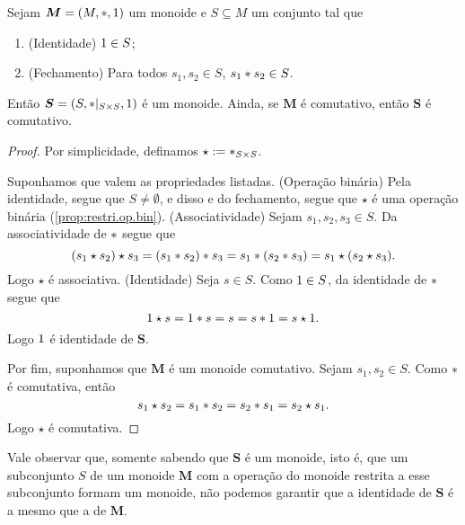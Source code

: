 \begin{proposition}
\label{alge:prop.submon}
Sejam $\bm M=(M,\ast,1)$ um monoide e $S \subseteq M$ um conjunto tal que
	\begin{enumerate}[label=\textbf{SM\arabic*.},ref={SM\arabic*}]
	\item \label{SM1} (Identidade) $1 \in S$;
	\item \label{SM2} (Fechamento) Para todos $s_1,s_2 \in S$, $s_1 \ast s_2 \in S$.
	\end{enumerate}
\noindent
Então $\bm S=(S,\ast|_{S \times S},1)$ é um monoide. Ainda, se $\bm M$ é comutativo, então $\bm S$ é comutativo.
\end{proposition}
\begin{proof} Por simplicidade, definamos $\star :=  \ast _{S \times S}$.


Suponhamos que valem as propriedades listadas. (Operação binária) Pela identidade, segue que $S \neq \emptyset$, e disso e do fechamento, segue que $\star$ é uma operação binária (\ref{prop:restri.op.bin}).
(Associatividade) Sejam $s_1,s_2,s_3 \in S$. Da associatividade de $ \ast $ segue que
	\begin{equation*}
	 (s_1 \star s_2) \star s_3 = (s_1  \ast  s_2)  \ast  s_3 = s_1  \ast  (s_2  \ast  s_3) = s_1 \star (s_2 \star s_3).
	 \end{equation*}
Logo $\star$ é associativa. (Identidade) Seja $s \in S$. Como $1 \in S$, da identidade de $ \ast $ segue que
	\begin{equation*}
	1 \star s = 1  \ast  s = s = s \ast  1 = s \star 1.
	\end{equation*}
Logo $1$ é identidade de $\bm S$.

Por fim, suponhamos que $\bm M$ é um monoide comutativo. Sejam $s_1,s_2 \in S$. Como $ \ast $ é comutativa, então
	\begin{equation*}
	s_1 \star s_2 = s_1  \ast  s_2 = s_2  \ast  s_1 = s_2 \star s_1.
	\end{equation*}
Logo $\star$ é comutativa.
\end{proof}

Vale observar que, somente sabendo que $\bm S$ é um monoide, isto é, que um subconjunto $S$ de um monoide $\bm M$ com a operação do monoide restrita a esse subconjunto formam um monoide, não podemos garantir que a identidade de $\bm S$ é a mesmo que a de $\bm M$.

